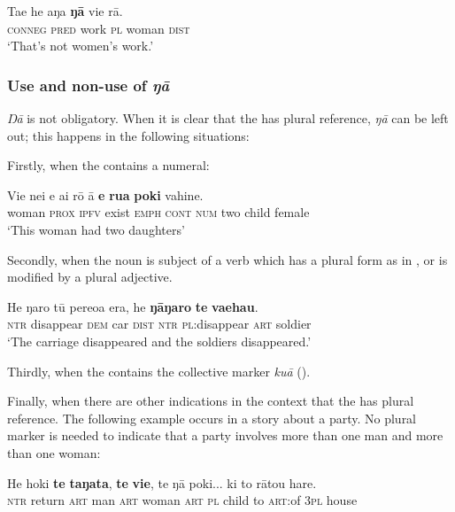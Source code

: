 \ea\label{ex:5.76}
\gll Ta{\ꞌ}e he aŋa \textbf{ŋā} vi{\ꞌ}e rā. \\
\textsc{conneg} \textsc{pred} work \textsc{pl} woman \textsc{dist} \\

\glt 
‘That’s not women’s work.’ \textstyleExampleref{[R347.103]} 
\z

\subsubsection[Use and non{}-use of ŋā ]{Use and non-use of \textit{ŋā}} \label{sec:5.5.1.2}

\textit{Ŋā} is not obligatory. When it is clear that the  has plural reference, \textit{ŋā} can be left out; this happens in the following situations:

Firstly, when the  contains a numeral:

\ea\label{ex:5.77}
\gll Vi{\ꞌ}e nei e ai rō {\ꞌ}ā \textbf{e} \textbf{rua} \textbf{poki} vahine. \\
woman \textsc{prox} \textsc{ipfv} exist \textsc{emph} \textsc{cont} \textsc{num} two child female \\

\glt 
‘This woman had two daughters’ \textstyleExampleref{[R491.008]} 
\z

Secondly, when the noun is subject of a verb which has a plural form as in , or is modified by a plural adjective.

\ea\label{ex:5.78}
\gll He ŋaro tū pere{\ꞌ}oa era, he \textbf{ŋāŋaro} \textbf{te} \textbf{va{\ꞌ}ehau}. \\
\textsc{ntr} disappear \textsc{dem} car \textsc{dist} \textsc{ntr} \textsc{pl}:disappear \textsc{art} soldier \\

\glt 
‘The carriage disappeared and the soldiers disappeared.’ \textstyleExampleref{[R491.039]} 
\z

Thirdly, when the  contains the collective marker \textit{kuā} ().

Finally, when there are other indications in the context that the  has plural reference. The following example occurs in a story about a party. No plural marker is needed to indicate that a party involves more than one man and more than one woman:

\ea\label{ex:5.79}
\gll He hoki \textbf{te} \textbf{taŋata}, \textbf{te} \textbf{vi{\ꞌ}e}, te ŋā poki... ki to rātou hare. \\
\textsc{ntr} return \textsc{art} man \textsc{art} woman \textsc{art} \textsc{pl} child to \textsc{art}:of \textsc{3pl} house \\

